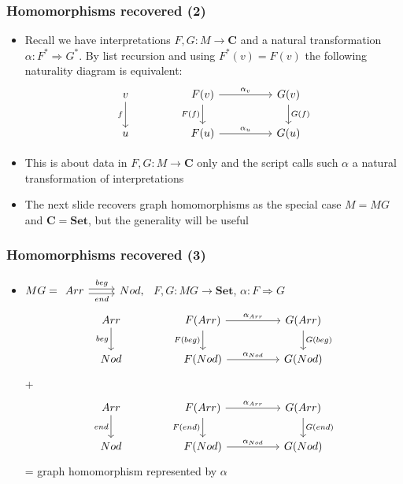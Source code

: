 \documentclass[handout]{beamer}
\newcommand{\To}{\Rightarrow}
\newcommand{\bfsf}[1]{{\boldsymbol{#1}}}
\newcommand{\Set}{\bfsf{Set}}
\newcommand{\CC}{\bfsf{C}}
\begin{document}
\frame
  {   
    \frametitle{Homomorphisms recovered (2)}\label{Ch3:Homs2}

 \begin{itemize}[<+->]
\item Recall we have {interpretations} $F,G : M\to \CC$ and a natural transformation
$\alpha: F^* \To G^*$. By list recursion and using $F^*(v) = F(v)$ the following
naturality diagram is equivalent:
\[
\begin{tikzcd}[ampersand replacement=\&]
v \arrow[swap]{d}{f} \&\& {F(v)}  \arrow[swap]{d}{F(f)}\arrow{rr}{\alpha_v} 
\&\& {G(v})\arrow{d}{G(f)}\\
u \&\&{F(u)}  \arrow{rr}{\alpha_u}\& \& {G(u)}
\end{tikzcd}
\]
\item This is about data in $F,G : M\to \CC$ only and the script calls 
such $\alpha$ a natural transformation of interpretations
\item The next slide recovers graph homomorphisms as
the special case $M=MG$ and $\CC=\Set$, but the generality will be useful
 \end{itemize}

 }

\frame
  {   
    \frametitle{Homomorphisms recovered (3)}\label{Ch3:Homs3}

 \begin{itemize}[<+->]
\item $MG = 
\begin{tikzcd}[ampersand replacement=\&]
Arr \arrow[yshift=0.5ex]{r}{beg} \arrow[swap, yshift=-0.5ex]{r}{end} \& Nod,
\end{tikzcd} $ $F,G: MG\to\Set$, $\alpha:F\To G$
\[
\begin{tikzcd}[ampersand replacement=\&]
Arr \arrow[swap]{d}{beg} \&\& {F(Arr)}  \arrow[swap]{d}{F(beg)}\arrow{rr}{\alpha_{Arr}} 
\&\& {G(Arr})\arrow{d}{G(beg)}\\
Nod \&\&{F(Nod)}  \arrow{rr}{\alpha_{Nod}}\& \& {G(Nod)}
\end{tikzcd}
\]
+
\[
\begin{tikzcd}[ampersand replacement=\&]
Arr \arrow[swap]{d}{end} \&\& {F(Arr)}  \arrow[swap]{d}{F(end)}\arrow{rr}{\alpha_{Arr}} 
\&\& {G(Arr})\arrow{d}{G(end)}\\
Nod \&\&{F(Nod)}  \arrow{rr}{\alpha_{Nod}}\& \& {G(Nod)}
\end{tikzcd}
\]
= graph homomorphism represented by $\alpha$ 
 \end{itemize}

 }
\end{document}
